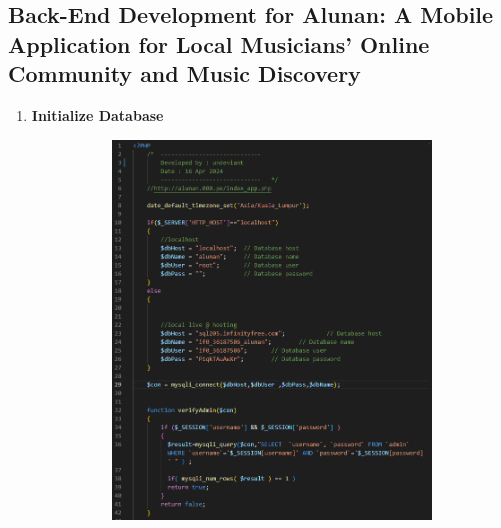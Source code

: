 \subsection{Back-End Development for Alunan: A Mobile Application for Local Musicians’ Online Community and Music Discovery}
\begin{enumerate}[1.]
    \item \textbf{Initialize Database}
    \begin{figure}[h]\ContinuedFloat
        \centering
        \begin{subfigure}[b]{0.6\textwidth}
            \centering
            \includegraphics[width=\textwidth]{mainmatter/images/backend/alunandb1.png}
            \label{fig:sub1}
        \end{subfigure}
        \hspace{0.04\textwidth}
        \begin{subfigure}[b]{0.6\textwidth}
            \centering

\end{subfigure}
\end{figure}
\end{enumerate}
